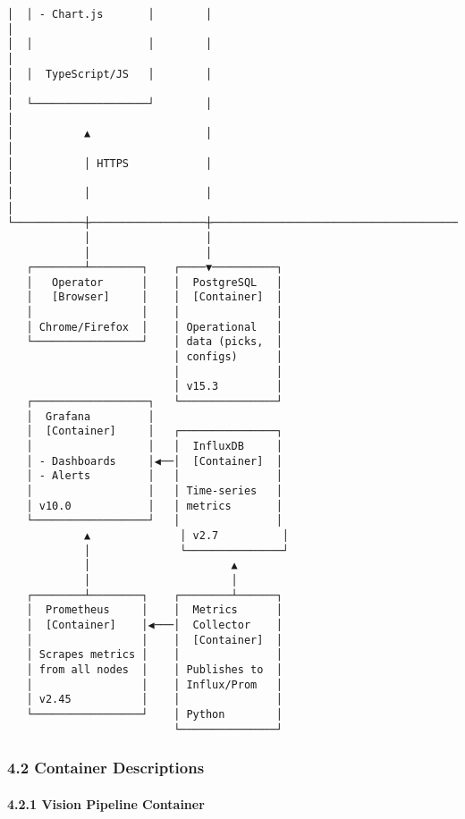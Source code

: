 \documentclass[
]{article}
\begin{document}
\begin{verbatim}
│  │ - Chart.js       │        │                                       │
│  │                  │        │                                       │
│  │  TypeScript/JS   │        │                                       │
│  └──────────────────┘        │                                       │
│           ▲                  │                                       │
│           │ HTTPS            │                                       │
│           │                  │                                       │
└───────────┼──────────────────┼───────────────────────────────────────┘
            │                  │
            │                  │
   ┌────────┴────────┐    ┌────▼──────────┐
   │   Operator      │    │  PostgreSQL   │
   │   [Browser]     │    │  [Container]  │
   │                 │    │               │
   │ Chrome/Firefox  │    │ Operational   │
   └─────────────────┘    │ data (picks,  │
                          │ configs)      │
                          │               │
                          │ v15.3         │
   ┌──────────────────┐   └───────────────┘
   │  Grafana         │
   │  [Container]     │   ┌───────────────┐
   │                  │   │  InfluxDB     │
   │ - Dashboards     │◀──│  [Container]  │
   │ - Alerts         │   │               │
   │                  │   │ Time-series   │
   │ v10.0            │   │ metrics       │
   └──────────────────┘   │               │
            ▲              │ v2.7          │
            │              └───────────────┘
            │                      ▲
            │                      │
   ┌────────┴────────┐    ┌────────┴──────┐
   │  Prometheus     │    │  Metrics      │
   │  [Container]    │◀───│  Collector    │
   │                 │    │  [Container]  │
   │ Scrapes metrics │    │               │
   │ from all nodes  │    │ Publishes to  │
   │                 │    │ Influx/Prom   │
   │ v2.45           │    │               │
   └─────────────────┘    │ Python        │
                          └───────────────┘
\end{verbatim}

\hypertarget{container-descriptions}{%
\subsubsection{4.2 Container
Descriptions}\label{container-descriptions}}

\hypertarget{vision-pipeline-container}{%
\paragraph{4.2.1 Vision Pipeline
Container}\label{vision-pipeline-container}}
\end{document}
